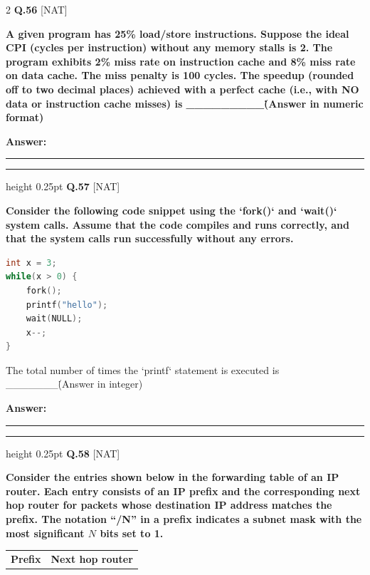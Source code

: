 \documentclass[a4paper,10pt,twoside]{article}
\begin{document}
\begin{multicols}{2}
\noindent\textbf{Q.56} \hfill {\footnotesize\textsf{[NAT]}}
\par\vspace{2pt}
{\bfseries A given program has 25\% load/store instructions. Suppose the ideal CPI (cycles per instruction) without any memory stalls is 2. The program exhibits 2\% miss rate on instruction cache and 8\% miss rate on data cache. The miss penalty is 100 cycles.
The speedup (rounded off to two decimal places) achieved with a perfect cache (i.e., with NO data or instruction cache misses) is \_\_\_\_\_\_\_\_\_\. (Answer in numeric format) \par}
\par\vspace{3pt}\noindent\textbf{Answer:} \rule{3.2cm}{0.4pt}
\par\vspace{6pt}\hrule height 0.25pt\vspace{6pt}
\noindent\textbf{Q.57} \hfill {\footnotesize\textsf{[NAT]}}
\par\vspace{2pt}
{\bfseries Consider the following code snippet using the `fork()` and `wait()` system calls. Assume that the code compiles and runs correctly, and that the system calls run successfully without any errors.
\begin{lstlisting}[language=C]
int x = 3;
while(x > 0) {
    fork();
    printf("hello");
    wait(NULL);
    x--;
}
\end{lstlisting}
The total number of times the `printf` statement is executed is \_\_\_\_\_\_\_\. (Answer in integer) \par}
\par\vspace{3pt}\noindent\textbf{Answer:} \rule{3.2cm}{0.4pt}
\par\vspace{6pt}\hrule height 0.25pt\vspace{6pt}
\noindent\textbf{Q.58} \hfill {\footnotesize\textsf{[NAT]}}
\par\vspace{2pt}
{\bfseries Consider the entries shown below in the forwarding table of an IP router. Each entry consists of an IP prefix and the corresponding next hop router for packets whose destination IP address matches the prefix. The notation ``/N'' in a prefix indicates a subnet mask with the most significant $N$ bits set to 1.
\begin{center}
\begin{tabular}{|l|c|}
\hline
\textbf{Prefix} & \textbf{Next hop router} \\

\end{tabular}
\end{center}}
\end{multicols}
\end{document}
